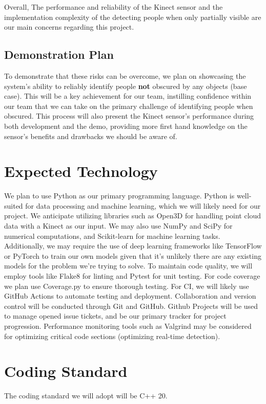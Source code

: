 \documentclass{article}
\begin{document}
Overall, The performance and reliability of the Kinect sensor and the implementation complexity of the detecting people when only partially visible are our main concerns regarding this project.

\subsection*{Demonstration Plan}

To demonstrate that these risks can be overcome, we plan on showcasing the system's ability to reliably identify people \textbf{not} obscured by any objects (base case). 
This will be a key achievement for our team, instilling confidence within our team that we can take on the primary challenge of identifying people when obscured.
This process will also present the Kinect sensor's performance during both development and the demo, providing more first hand knowledge on the sensor's benefits and drawbacks we should be aware of.

\section{Expected Technology}

We plan to use Python as our primary programming language. 
Python is well-suited for data processing and machine learning, which we will likely need for our project.
We anticipate utilizing libraries such as Open3D for handling point cloud data with a Kinect as our input. 
We may also use NumPy and SciPy for numerical computations, and Scikit-learn for machine learning tasks.\\

Additionally, we may require the use of deep learning frameworks like TensorFlow or PyTorch to train our own models given that it's unlikely there are any existing models for the problem we're trying to solve.
To maintain code quality, we will employ tools like Flake8 for linting and Pytest for unit testing. 
For code coverage we plan use Coverage.py to ensure thorough testing.
For CI, we will likely use GitHub Actions to automate testing and deployment.
Collaboration and version control will be conducted through Git and GitHub. Github Projects will be used to manage opened issue tickets, and be our primary tracker for project progression.
Performance monitoring tools such as Valgrind may be considered for optimizing critical code sections (optimizing real-time detection). 

\section{Coding Standard}
The coding standard we will adopt will be C++ 20. 
\end{document}
